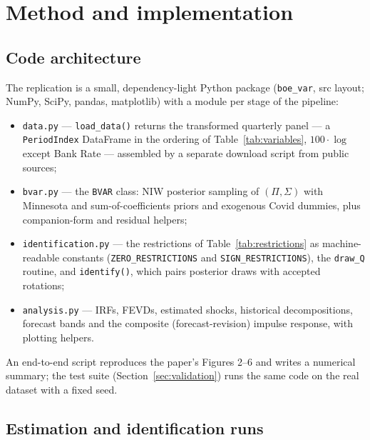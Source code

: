 \section{Method and implementation}
\label{sec:implementation}

\subsection{Code architecture}

The replication is a small, dependency-light Python package (\texttt{boe\_var}, src layout; NumPy, SciPy, pandas, matplotlib) with a module per stage of the pipeline:

\begin{itemize}
\item \texttt{data.py} --- \texttt{load\_data()} returns the transformed quarterly panel --- a \texttt{PeriodIndex} DataFrame in the ordering of Table~\ref{tab:variables}, $100\cdot\log$ except Bank Rate --- assembled by a separate download script from public sources;
\item \texttt{bvar.py} --- the \texttt{BVAR} class: NIW posterior sampling of $(\Pi, \Sigma)$ with Minnesota and sum-of-coefficients priors and exogenous Covid dummies, plus companion-form and residual helpers;
\item \texttt{identification.py} --- the restrictions of Table~\ref{tab:restrictions} as machine-readable constants (\texttt{ZERO\_\allowbreak RESTRICTIONS} and \texttt{SIGN\_\allowbreak RESTRICTIONS}), the \citet{arias2018} \texttt{draw\_Q} routine, and \texttt{identify()}, which pairs posterior draws with accepted rotations;
\item \texttt{analysis.py} --- IRFs, FEVDs, estimated shocks, historical decompositions, forecast bands and the composite (forecast-revision) impulse response, with plotting helpers.
\end{itemize}

An end-to-end script reproduces the paper's Figures 2--6 and writes a numerical summary; the test suite (Section~\ref{sec:validation}) runs the same code on the real dataset with a fixed seed.

\subsection{Estimation and identification runs}

